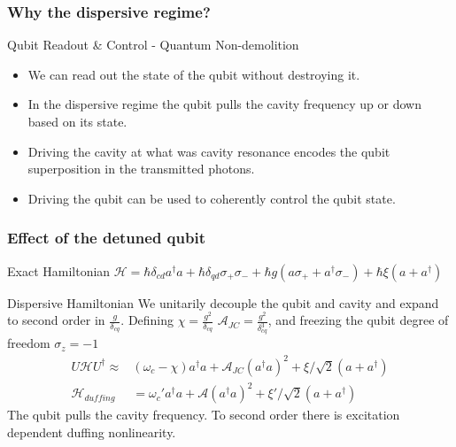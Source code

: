 \documentclass{beamer}
\begin{document}
\begin{frame}
    \frametitle{Why the dispersive regime?}
    \begin{block}{Qubit Readout \& Control - Quantum Non-demolition}
        \begin{itemize}
            \item We can read out the state of the qubit 
                    without destroying it. 
            \item In the dispersive regime the qubit pulls the 
                    cavity frequency up or down based on its state.
            \item Driving the cavity at what was cavity 
                    resonance encodes the qubit superposition 
                    in the transmitted photons. 
            \item Driving the qubit can be used to coherently 
                    control the qubit state. 
        \end{itemize}
    \end{block}
\end{frame}
\begin{frame}
    \frametitle{Effect of the detuned qubit}
    \begin{block}{Exact Hamiltonian}
        $
        \mathscr{H} = \hbar \delta_{cd} a^\dagger a + 
        \hbar \delta_{qd}\sigma_+ \sigma_- + 
        \hbar g ( a \sigma_+ + a^\dagger \sigma_- ) 
        +\hbar \xi (a+a^\dagger)
        $
    \end{block}
    \begin{block}{Dispersive Hamiltonian}
    We unitarily decouple the qubit and cavity 
    and expand to second order in $\frac{g}{\delta_{cq}}$. Defining 
    $\chi = \frac{g^2}{\delta_{cq}}$
    $\mathscr{A}_{JC} = \frac{g^2}{\delta_{cq}^3}$, 
    and freezing the qubit degree of freedom 
    $\sigma_z = -1$
    \begin{align}
    U\mathscr{H}U ^ \dagger \approx& 
         \left(\omega_c - \chi\right) a ^ \dagger a
        + \mathscr{A}_{JC}\left(a^\dagger a\right)^2
        + \xi/\sqrt{2} ( a + a^\dagger ) \\
    \mathscr{H}_{duffing} &= \omega_c' a^\dagger a 
        + \mathscr{A} \left(a^\dagger a\right)^2 
        + \xi'/\sqrt{2}\left(a+a^\dagger\right)
    \end{align} 
    The qubit pulls the cavity frequency. 
    To second order there is excitation dependent 
    duffing nonlinearity.
    \end{block}
\end{frame}
\end{document}
